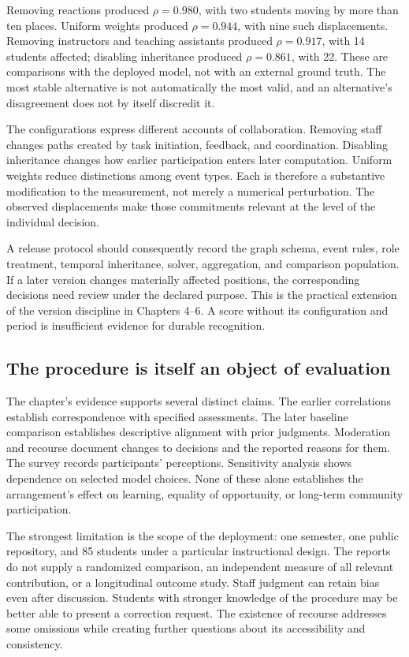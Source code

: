 Removing reactions produced \(\rho=0.980\), with two students moving by more than ten places. Uniform weights produced \(\rho=0.944\), with nine such displacements. Removing instructors and teaching assistants produced \(\rho=0.917\), with 14 students affected; disabling inheritance produced \(\rho=0.861\), with 22. These are comparisons with the deployed model, not with an external ground truth. The most stable alternative is not automatically the most valid, and an alternative's disagreement does not by itself discredit it.

The configurations express different accounts of collaboration. Removing staff changes paths created by task initiation, feedback, and coordination. Disabling inheritance changes how earlier participation enters later computation. Uniform weights reduce distinctions among event types. Each is therefore a substantive modification to the measurement, not merely a numerical perturbation. The observed displacements make those commitments relevant at the level of the individual decision.

A release protocol should consequently record the graph schema, event rules, role treatment, temporal inheritance, solver, aggregation, and comparison population. If a later version changes materially affected positions, the corresponding decisions need review under the declared purpose. This is the practical extension of the version discipline in Chapters 4--6. A score without its configuration and period is insufficient evidence for durable recognition.

\subsection{The procedure is itself an object of evaluation}
The chapter's evidence supports several distinct claims. The earlier correlations establish correspondence with specified assessments. The later baseline comparison establishes descriptive alignment with prior judgments. Moderation and recourse document changes to decisions and the reported reasons for them. The survey records participants' perceptions. Sensitivity analysis shows dependence on selected model choices. None of these alone establishes the arrangement's effect on learning, equality of opportunity, or long-term community participation.

The strongest limitation is the scope of the deployment: one semester, one public repository, and 85 students under a particular instructional design. The reports do not supply a randomized comparison, an independent measure of all relevant contribution, or a longitudinal outcome study. Staff judgment can retain bias even after discussion. Students with stronger knowledge of the procedure may be better able to present a correction request. The existence of recourse addresses some omissions while creating further questions about its accessibility and consistency.

